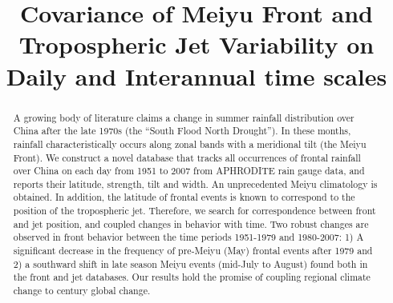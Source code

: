 \documentclass[draft,grl]{AGUTeX}
\begin{document}
%
%


\title{Covariance of Meiyu Front and Tropospheric Jet Variability on Daily and Interannual time scales}

%
%






%
%


\begin{abstract}
A growing body of literature claims a change in summer rainfall distribution over China after the late 1970s (the ``South Flood North Drought''). In these months, rainfall characteristically occurs along zonal bands with a meridional tilt (the Meiyu Front). We construct a novel database that tracks all occurrences of frontal rainfall over China on each day from 1951 to 2007 from APHRODITE rain gauge data, and reports their latitude, strength, tilt and width. An unprecedented Meiyu climatology is obtained. In addition, the latitude of frontal events is known to correspond to the position of the tropospheric jet. Therefore, we search for correspondence between front and jet position, and coupled changes in behavior with time. Two robust changes are observed in front behavior between the time periods 1951-1979 and 1980-2007: 1) A significant decrease in the frequency of pre-Meiyu (May) frontal events after 1979 and 2) a southward shift in late season Meiyu events (mid-July to August) found both in the front and jet databases. Our results hold the promise of coupling regional climate change to  century global change.
\end{abstract}
\end{document}
